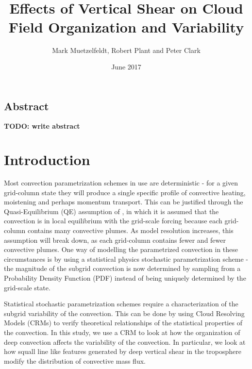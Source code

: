 \documentclass[11pt,a4paper]{article}
\title{Effects of Vertical Shear on Cloud Field Organization and Variability}
\author{Mark Muetzelfeldt, Robert Plant and  Peter Clark}
\date{June 2017}
\newcommand\todo[1]{\textbf{TODO: #1}}
\begin{document}
\maketitle

\begin{center}
\section*{Abstract}
\end{center}
\todo{write abstract}


\section{Introduction}

Most convection parametrization schemes in use are deterministic - for a given grid-column state they will produce a single specific profile of convective heating, moistening and perhaps momentum transport. This can be justified through the Quasi-Equilibrium (QE) assumption of \cite{arakawa1974interaction}, in which it is assumed that the convection is in local equilibrium with the grid-scale forcing because each grid-column contains many convective plumes. As model resolution increases, this assumption will break down, as each grid-column contains fewer and fewer convective plumes. One way of modelling the parametrized convection in these circumstances is by using a statistical physics stochastic parametrization scheme \parencite{berner2017stochastic} - the magnitude of the subgrid convection is now determined by sampling from a Probability Density Function (PDF) instead of being uniquely determined by the grid-scale state.

Statistical stochastic parametrization schemes require a characterization of the subgrid variability of the convection. This can be done by using Cloud Resolving Models (CRMs) to verify theoretical relationships of the statistical properties of the convection. In this study, we use a CRM to look at how the organization of deep convection affects the variability of the convection. In particular, we look at how squall line like features generated by deep vertical shear in the troposphere modify the distribution of convective mass flux.
\end{document}
